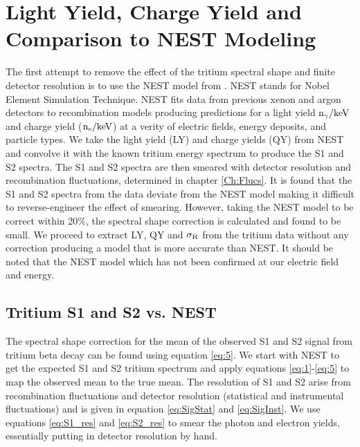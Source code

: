 \section{Light Yield, Charge Yield and Comparison to NEST Modeling}

The first attempt to remove the effect of the tritium spectral shape and finite detector resolution is to use the NEST model from \cite{NEST_2013}. 
NEST stands for Nobel Element Simulation Technique. NEST fits data from previous xenon and argon detectors to recombination models producing predictions for a light yield $\rm n_\gamma/keV$ and charge yield ($\rm n_e/keV$) at a verity of electric fields, energy deposits, and particle types. We take the light yield (LY) and charge yields (QY) from NEST and convolve it with the known tritium energy spectrum to produce the S1 and S2 spectra. The S1 and S2 spectra are then smeared with detector resolution and recombination fluctuations, determined in chapter \ref{Ch:Flucs}. It is found  that the S1 and S2 spectra from the data deviate from the NEST model making it difficult to reverse-engineer the effect of smearing. However, taking the NEST model to be correct within 20\%, the spectral shape correction is calculated and found to be small. We proceed to extract LY, QY and $\rm \sigma_R$ from the tritium data without any correction producing a model that is more accurate than NEST. It should be noted that the NEST model which has not been confirmed at our electric field and energy. %



\subsection{Tritium S1 and S2 vs. NEST}
\label{sec:Spec_Corr}

The spectral shape correction for the mean of the observed S1 and S2 signal from tritium beta decay can be found using equation \ref{eq:5}. We start with NEST to get the expected S1 and S2 tritium spectrum and apply equations \ref{eq:1}-\ref{eq:5} to map the observed mean to the true mean. The resolution of S1 and S2 arise from recombination fluctuations and detector resolution (statistical and instrumental fluctuations) and is given in equation \ref{eq:SigStat} and \ref{eq:SigInst}. We use equations \ref{eq:S1_res} and \ref{eq:S2_res} to smear the photon and electron yields, essentially putting in detector resolution by hand.

